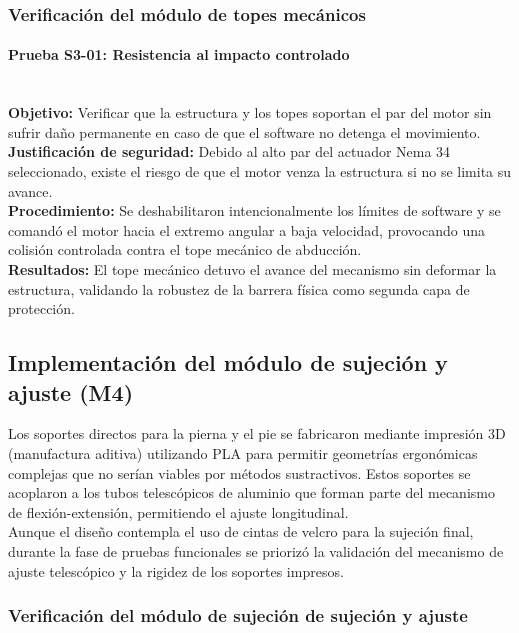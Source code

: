 \subsubsection{Verificación del módulo de topes mecánicos}
\paragraph*{Prueba S3-01: Resistencia al impacto controlado}\mbox{}\\
\textbf{Objetivo:} Verificar que la estructura y los topes soportan el par del motor sin sufrir daño permanente en caso de que el software no detenga el movimiento.
\\
\textbf{Justificación de seguridad:} Debido al alto par del actuador Nema 34 seleccionado, existe el riesgo de que el motor venza la estructura si no se limita su avance.
\\
\textbf{Procedimiento:} Se deshabilitaron intencionalmente los límites de software y se comandó el motor hacia el extremo angular a baja velocidad, provocando una colisión controlada contra el tope mecánico de abducción.
\\
\textbf{Resultados:} El tope mecánico detuvo el avance del mecanismo sin deformar la estructura, validando la robustez de la barrera física como segunda capa de protección.

\subsection{Implementación del módulo de sujeción y ajuste (M4)}
Los soportes directos para la pierna y el pie se fabricaron mediante impresión 3D (manufactura aditiva) utilizando PLA para permitir geometrías ergonómicas complejas que no serían viables por métodos sustractivos. Estos soportes se acoplaron a los tubos telescópicos de aluminio que forman parte del mecanismo de flexión-extensión, permitiendo el ajuste longitudinal.\\
Aunque el diseño contempla el uso de cintas de velcro para la sujeción final, durante la fase de pruebas funcionales se priorizó la validación del mecanismo de ajuste telescópico y la rigidez de los soportes impresos.

\subsubsection{Verificación del módulo de sujeción de sujeción y ajuste}

